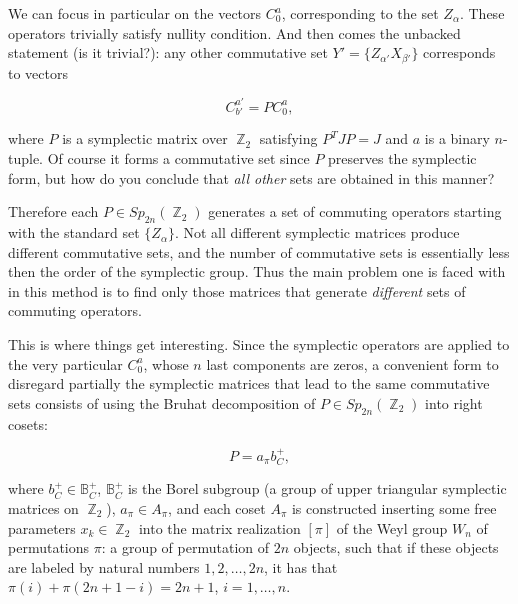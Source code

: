 \documentclass[a4paper,11pt]{report}
\DeclareMathOperator{\Z}{\mathbb{Z}}
\begin{document}
    We can focus in particular on the vectors $C_0^{a}$,
    corresponding to the set $Z_\alpha$. These operators
    trivially satisfy nullity condition. And then comes the
    unbacked statement (is it trivial?): any other
    commutative set $Y' = \{Z_{\alpha'}X_{\beta'}\}$ 
    corresponds to vectors

    \begin{equation}
        C_{b'}^{a'} = P C_0^{a},
    \end{equation}

    where $P$ is a symplectic matrix over $\Z_2$ satisfying
    $P^{T} J P = J$ and $a$ is a binary $n$-tuple. Of course
    it forms a commutative set since $P$ preserves the
    symplectic form, but how do you conclude that
    \textit{all other} sets are obtained in this manner?

    Therefore each $P \in Sp_{2n}(\Z_2)$ generates a set of
    commuting operators starting with the standard set
    $\{Z_\alpha\}$. Not all different symplectic matrices
    produce different commutative sets, and the number of
    commutative sets is essentially less then the order of
    the symplectic group. Thus the main problem one is faced
    with in this method is to find only those matrices that
    generate \textit{different} sets of commuting operators.

    This is where things get interesting. Since the
    symplectic operators are applied to the very particular
    $C_0^a$, whose $n$ last components are zeros, a
    convenient form to disregard partially the symplectic
    matrices that lead to the same commutative sets consists
    of using the Bruhat decomposition of $P \in
    Sp_{2n}(\Z_2)$ into right cosets:

    \begin{equation}
        P = a_\pi b_C^{+},
    \end{equation}

    where $b_C^{+} \in \mathbb B_C^{+}$, $\mathbb B_C^{+}$ 
    is the Borel subgroup (a group of upper triangular
    symplectic matrices on $\Z_2$), $a_\pi \in A_\pi$, and
    each coset $A_\pi$ is constructed inserting some free
    parameters $x_k \in \Z_2$ into the matrix realization
    $[\pi]$ of the Weyl group $W_n$ of permutations $\pi$: a
    group of permutation of $2n$ objects, such that if these
    objects are labeled by natural numbers $1,2,\ldots,2n$,
    it has that $\pi(i) + \pi(2n+1-i) = 2n+1$, $i =
    1,\ldots,n$. 


    
\end{document}
